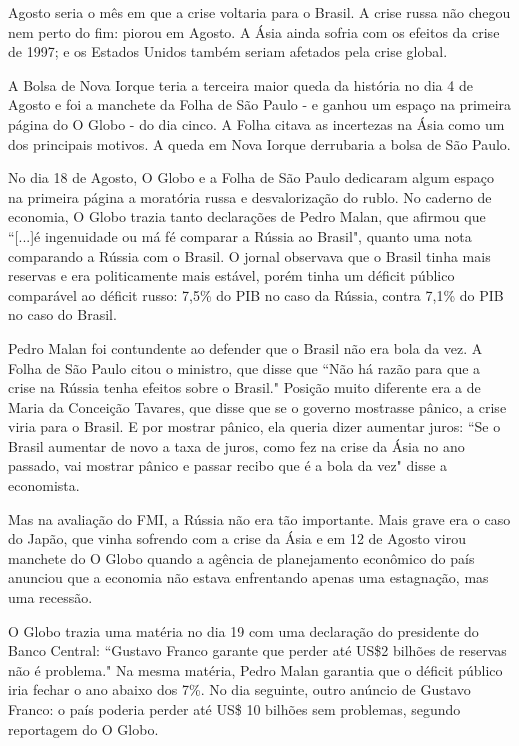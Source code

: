 \documentclass{article}
\begin{document}

Agosto seria o mês em que a crise voltaria para o Brasil. A crise russa não chegou nem perto do fim: piorou em Agosto. A Ásia ainda sofria com os efeitos da crise de 1997; e os Estados Unidos também seriam afetados pela crise global.

A Bolsa de Nova Iorque teria a terceira maior queda da história no dia 4 de Agosto e foi a manchete da Folha de São Paulo - e ganhou um espaço na primeira página do O Globo - do dia cinco. A Folha citava as incertezas na Ásia como um dos principais motivos. A queda em Nova Iorque derrubaria a bolsa de São Paulo.   

No dia 18 de Agosto, O Globo e a Folha de São Paulo dedicaram algum espaço na primeira página a moratória russa e desvalorização do rublo. No caderno de economia, O Globo trazia tanto declarações de Pedro Malan, que afirmou que ``[...]é ingenuidade ou má fé comparar a Rússia ao Brasil", quanto uma nota comparando a Rússia com o Brasil. O jornal observava que o Brasil tinha mais reservas e era politicamente mais estável, porém tinha um déficit público comparável ao déficit russo: 7,5\% do PIB no caso da Rússia, contra 7,1\% do PIB no caso do Brasil. 

Pedro Malan foi contundente ao defender que o Brasil não era bola da vez. A Folha de São Paulo citou o ministro, que disse que ``Não há razão para que a crise na Rússia tenha efeitos sobre o Brasil." Posição muito diferente era a de Maria da Conceição Tavares, que disse que se o governo mostrasse pânico, a crise viria para o Brasil. E por mostrar pânico, ela queria dizer aumentar juros: ``Se o Brasil aumentar de novo a taxa de juros, como fez na crise da Ásia no ano passado, vai mostrar pânico e passar recibo que é a bola da vez" disse a economista. 

Mas na avaliação do FMI, a Rússia não era tão importante. Mais grave era o caso do Japão, que vinha sofrendo com a crise da Ásia e em 12 de Agosto virou manchete do O Globo quando a agência de planejamento econômico do país anunciou que a economia não estava enfrentando apenas uma estagnação, mas uma recessão. 
  
O Globo trazia uma matéria no dia 19 com uma declaração do presidente do Banco Central: ``Gustavo Franco garante que perder até US\$2 bilhões de reservas não é problema." Na mesma matéria, Pedro Malan garantia que o déficit público iria fechar o ano abaixo dos 7\%. No dia seguinte, outro anúncio de Gustavo Franco: o país poderia perder até US\$ 10 bilhões sem problemas, segundo reportagem do O Globo.  
\end{document}
